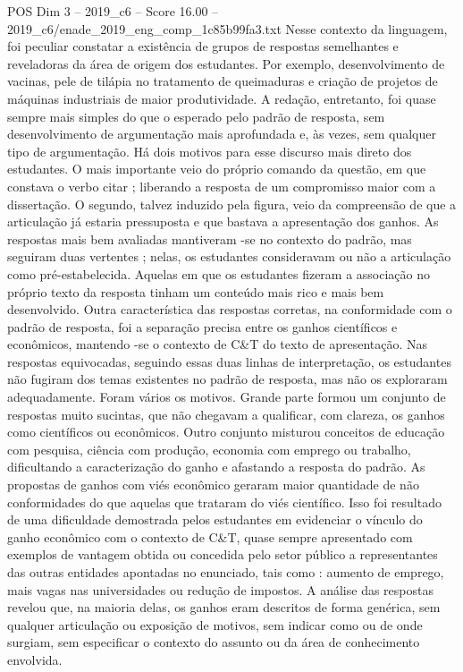 \begin{textsample}{POS Dim 3 – 2019\_c6 – Score 16.00 – 2019\_c6/enade\_2019\_eng\_comp\_1c85b99fa3.txt}
Nesse contexto da linguagem, foi peculiar constatar a existência de grupos de respostas semelhantes e reveladoras da área de origem dos estudantes.
Por exemplo, desenvolvimento de vacinas, pele de tilápia no tratamento de queimaduras e criação de projetos de máquinas industriais de maior produtividade.
A redação, entretanto, foi quase sempre mais simples do que o esperado pelo padrão de resposta, sem desenvolvimento de argumentação mais aprofundada e, às vezes, sem qualquer tipo de argumentação.
Há dois motivos para esse discurso mais direto dos estudantes.
O mais importante veio do próprio comando da questão, em que constava o verbo citar ; liberando a resposta de um compromisso maior com a dissertação.
O segundo, talvez induzido pela figura, veio da compreensão de que a articulação já estaria pressuposta e que bastava a apresentação dos ganhos.
As respostas mais bem avaliadas mantiveram -se no contexto do padrão, mas seguiram duas vertentes ; nelas, os estudantes consideravam ou não a articulação como pré-estabelecida.
Aquelas em que os estudantes fizeram a associação no próprio texto da resposta tinham um conteúdo mais rico e mais bem desenvolvido.
Outra característica das respostas corretas, na conformidade com o padrão de resposta, foi a separação precisa entre os ganhos científicos e econômicos, mantendo -se o contexto de C\&T do texto de apresentação.
Nas respostas equivocadas, seguindo essas duas linhas de interpretação, os estudantes não fugiram dos temas existentes no padrão de resposta, mas não os exploraram adequadamente.
Foram vários os motivos.
Grande parte formou um conjunto de respostas muito sucintas, que não chegavam a qualificar, com clareza, os ganhos como científicos ou econômicos.
Outro conjunto misturou conceitos de educação com pesquisa, ciência com produção, economia com emprego ou trabalho, dificultando a caracterização do ganho e afastando a resposta do padrão.
As propostas de ganhos com viés econômico geraram maior quantidade de não conformidades do que aquelas que trataram do viés científico.
Isso foi resultado de uma dificuldade demostrada pelos estudantes em evidenciar o vínculo do ganho econômico com o contexto de C\&T, quase sempre apresentado com exemplos de vantagem obtida ou concedida pelo setor público a representantes das outras entidades apontadas no enunciado, tais como : aumento de emprego, mais vagas nas universidades ou redução de impostos.
A análise das respostas revelou que, na maioria delas, os ganhos eram descritos de forma genérica, sem qualquer articulação ou exposição de motivos, sem indicar como ou de onde surgiam, sem especificar o contexto do assunto ou da área de conhecimento envolvida.

\end{textsample}
